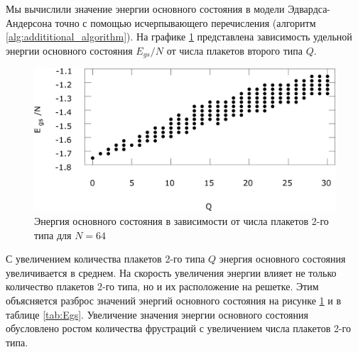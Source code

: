 \documentclass[utf8, babel, sor, jor, amsmath, amssymb, reprint]{elsarticle} %
\begin{document}
Мы вычислили значение энергии основного состояния в модели Эдвардса-Андерсона точно с помощью исчерпывающего перечисления (алгоритм \ref{alg:addititional_algorithm}). На графике \ref{fig:E(Q)} представлена зависимость удельной энергии основного состояния $E_{gs}/N$ от числа плакетов второго типа $Q$. 


\begin{figure}[H]
	\centering
		\includegraphics[width=0.9\linewidth]{pictures/E_Q.eps}
	\caption{Энергия основного состояния в зависимости от числа плакетов 2-го типа для $N=64$}
	\label{fig:E(Q)}
\end{figure}

С увеличением количества плакетов 2-го типа $Q$ энергия основного состояния увеличивается в среднем. На скорость увеличения энергии влияет не только количество плакетов 2-го типа, но и их расположение на решетке. Этим объясняется разброс значений энергий основного состояния на рисунке \ref{fig:E(Q)} и в таблице \ref{tab:Egs}.
Увеличение значения энергии основного состояния обусловлено ростом количества фрустраций с увеличением числа плакетов 2-го типа.
\end{document}
